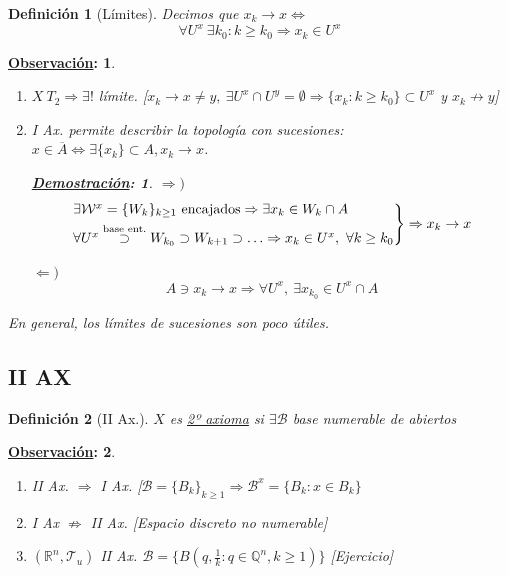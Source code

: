 \documentclass[10pt,a4paper,openright]{book}
\theoremstyle{break}
\newtheorem*{defi}{Definición}
\newtheorem*{demo}{\underline{Demostración}:}
\newtheorem*{obs}{\underline{Observación}:}
\begin{document}
\begin{defi}[Límites]
Decimos que $x_k \rightarrow x \Leftrightarrow$ 
\[
\forall U^x\ \exists k_0 : k \ge k_0 \Rightarrow x_k \in U^x
\]
\end{defi}
\begin{obs}
\begin{enumerate}
    \item $X\ T_2 \Rightarrow \exists! $ límite. [$x_k \rightarrow x \neq y,\ \exists U^x \cap U^y = \emptyset \Rightarrow \{x_k : k \ge k_0\} \subset U^x$ y $x_k \not \rightarrow y$]

    \item I Ax. permite describir la topología con sucesiones: $x \in \overline{A} \Leftrightarrow \exists \{x_k\} \subset A, x_k \rightarrow x$.

    \begin{demo}
    $\Rightarrow)$
    \[
    \begin{rcases}
        \exists \mathcal{W}^x = \{W_k\}_{k \ge 1} \text{ encajados} \Rightarrow \exists x_k \in W_k \cap A\\
        \forall U^x \stackrel{\text{base ent.}}{\supset} W_{k_0} \supset W_{k + 1} \supset \ldots \Rightarrow x_k \in U^x,\ \forall k \ge k_0  
    \end{rcases} \Rightarrow x_k \rightarrow x
    \]

    $\Leftarrow)$
    \[
    A \ni x_k \rightarrow x \Rightarrow \forall U^x,\ \exists x_{k_0} \in U^x \cap A
    \]
    \end{demo}
\end{enumerate}
En general, los límites de sucesiones son poco útiles.
\end{obs}

\subsection{II AX}%
\label{sub:iiax}
\begin{defi}[II Ax.]
$X$ es \underline{2º axioma} si $\exists \mathcal{B}$ base numerable de abiertos
\end{defi}

\begin{obs}
\begin{enumerate}
    \item II Ax. $\Rightarrow$ I Ax. [$\mathcal{B} = \{B_k\}_{k \ge 1} \Rightarrow \mathcal{B}^x = \{B_k : x \in B_k\}$
    \item I Ax $\not \Rightarrow$ II Ax. [Espacio discreto no numerable]
    \item $\left( \mathbb{R}^n, \mathcal{T}_{u} \right)$ II Ax. $\mathcal{B} = \{B \left( q, \frac{1}{k} : q \in \mathbb{Q}^n, k \ge 1 \right)\}$ [Ejercicio]
\end{enumerate}
\end{obs}
\end{document}

